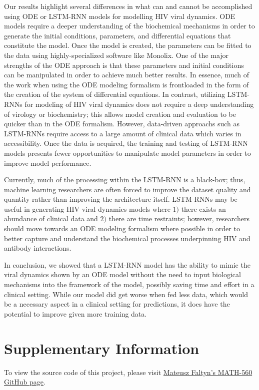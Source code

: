 \documentclass[fleqn,10pt]{wlscirep}
\begin{document}
Our results highlight several differences in what can and cannot be accomplished using ODE or LSTM-RNN models for modelling HIV viral dynamics. ODE models require a deeper understanding of the biochemical mechanisms in order to generate the initial conditions, parameters, and differential equations that constitute the model. Once the model is created, the parameters can be fitted to the data using highly-specialized software like Monolix. One of the major strengths of the ODE approach is that these parameters and initial conditions can be manipulated in order to achieve much better results. In essence, much of the work when using the ODE modeling formalism is frontloaded in the form of the creation of the system of differential equations. In contrast, utilizing LSTM-RNNs for modeling of HIV viral dynamics does not require a deep understanding of virology or biochemistry; this allows model creation and evaluation to be quicker than in the ODE formalism. However, data-driven approachs such as LSTM-RNNs require access to a large amount of clinical data which varies in accessibility. Once the data is acquired, the training and testing of LSTM-RNN models presents fewer opportunities to manipulate model parameters in order to improve model performance. 

Currently, much of the processing within the LSTM-RNN is a black-box; thus, machine learning researchers are often forced to improve the dataset quality and quantity rather than improving the architecture itself. LSTM-RNNs may be useful in generating HIV viral dynamics models where $1)$ there exists an abundance of clinical data and $2)$ there are time restraints; however, researchers should move towards an ODE modeling formalism where possible in order to better capture and understand the biochemical processes underpinning HIV and antibody interactions. 

In conclusion, we showed that a LSTM-RNN model has the ability to mimic the viral dynamics shown by an ODE model without the need to input biological mechanisms into the framework of the model, possibly saving time and effort in a clinical setting. While our model did get worse when fed less data, which would be a necessary aspect in a clinical setting for predictions, it does have the potential to improve given more training data.



\section*{Supplementary Information}
To view the source code of this project, please visit \href{https://github.com/mattfaltyn/MATH-560/tree/main/project}{Mateusz Faltyn's MATH-560 GitHub page}.
\end{document}
